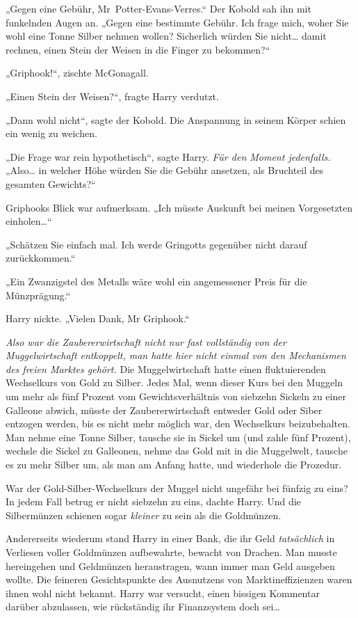 „Gegen eine Gebühr, Mr~Potter-Evans-Verres.“ Der Kobold sah ihn mit funkelnden Augen an. „Gegen eine bestimmte Gebühr. Ich frage mich, woher Sie wohl eine Tonne Silber nehmen wollen? Sicherlich würden Sie nicht… damit rechnen, einen Stein der Weisen in die Finger zu bekommen?“

„Griphook!“, zischte McGonagall. 

„Einen Stein der Weisen?“, fragte Harry verdutzt.

„Dann wohl nicht“, sagte der Kobold. Die Anspannung in seinem Körper schien ein wenig zu weichen.

„Die Frage war rein hypothetisch“, sagte Harry. \emph{Für den Moment jedenfalls.} „Also… in welcher Höhe würden Sie die Gebühr ansetzen, als Bruchteil des gesamten Gewichts?“

Griphooks Blick war aufmerksam. „Ich müsste Auskunft bei meinen Vorgesetzten einholen…“

„Schätzen Sie einfach mal. Ich werde Gringotts gegenüber nicht darauf zurückkommen.“

„Ein Zwanzigstel des Metalls wäre wohl ein angemessener Preis für die Münzprägung.“

Harry nickte. „Vielen Dank, Mr Griphook.“

\emph{Also war die Zaubererwirtschaft nicht nur fast vollständig von der Muggelwirtschaft entkoppelt, man hatte hier nicht einmal von den Mechanismen des freien Marktes gehört.} Die Muggelwirtschaft hatte einen fluktuierenden Wechselkurs von Gold zu Silber. Jedes Mal, wenn dieser Kurs bei den Muggeln um mehr als fünf Prozent vom Gewichtsverhältnis von siebzehn Sickeln zu einer Galleone abwich, müsste der Zaubererwirtschaft entweder Gold oder Siber entzogen werden, bis es nicht mehr möglich war, den Wechselkurs beizubehalten. Man nehme eine Tonne Silber, tausche sie in Sickel um (und zahle fünf Prozent), wechsle die Sickel zu Galleonen, nehme das Gold mit in die Muggelwelt, tausche es zu mehr Silber um, als man am Anfang hatte, und wiederhole die Prozedur.

War der Gold-Silber-Wechselkurs der Muggel nicht ungefähr bei fünfzig zu eins? In jedem Fall betrug er nicht siebzehn zu eins, dachte Harry. Und die Silbermünzen schienen sogar \emph{kleiner} zu sein als die Goldmünzen.

Andererseits wiederum stand Harry in einer Bank, die ihr Geld \emph{tatsächlich} in Verliesen voller Goldmünzen aufbewahrte, bewacht von Drachen. Man musste hereingehen und Geldmünzen heraustragen, wann immer man Geld ausgeben wollte. Die feineren Gesichtspunkte des Ausnutzens von Marktineffizienzen waren ihnen wohl nicht bekannt. Harry war versucht, einen bissigen Kommentar darüber abzulassen, wie rückständig ihr Finanzsystem doch sei…

